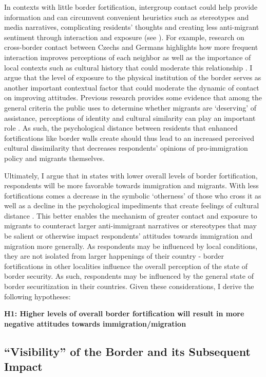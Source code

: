 \documentclass[12pt,]{article}
\begin{document}
In contexts with little border fortification, intergroup contact could
help provide information and can circumvent convenient heuristics such
as stereotypes and media narratives, complicating residents' thoughts
and creating less anti-migrant sentiment through interaction and
exposure (see \citet{pettigrew2006}). For example, research on
cross-border contact between Czechs and Germans highlights how more
frequent interaction improves perceptions of each neighbor as well as
the importance of local contexts such as cultural history that could
moderate this relationship \citep{mirwaldt2010}. I argue that the level
of exposure to the physical institution of the border serves as another
important contextual factor that could moderate the dynamic of contact
on improving attitudes. Previous research provides some evidence that
among the general criteria the public uses to determine whether migrants
are `deserving' of assistance, perceptions of identity and cultural
similarity can play an important role
\citep{deconinck2020a, carmel2021}. As such, the psychological distance
between residents that enhanced fortifications like border walls create
should thus lead to an increased perceived cultural dissimilarity that
decreases respondents' opinions of pro-immigration policy and migrants
themselves.

Ultimately, I argue that in states with lower overall levels of border
fortification, respondents will be more favorable towards immigration
and migrants. With less fortifications comes a decrease in the symbolic
`otherness' of those who cross it \citep{jaramillo-dent2021} as well as
a decline in the psychological impediments that create feelings of
cultural distance \citep{mutz2022}. This better enables the mechanism of
greater contact and exposure to migrants to counteract larger
anti-immigrant narratives or stereotypes that may be salient or
otherwise impact respondents' attitudes towards immigration and
migration more generally. As respondents may be influenced by local
conditions, they are not isolated from larger happenings of their
country - border fortifications in other localities influence the
overall perception of the state of border security. As such, respondents
may be influenced by the general state of border securitization in their
countries. Given these considerations, I derive the following
hypotheses:

\textbf{H1: Higher levels of overall border fortification will result in
more negative attitudes towards immigration/migration}

\subsection{``Visibility'' of the Border and its Subsequent
Impact}\label{visibility-of-the-border-and-its-subsequent-impact}
\end{document}
